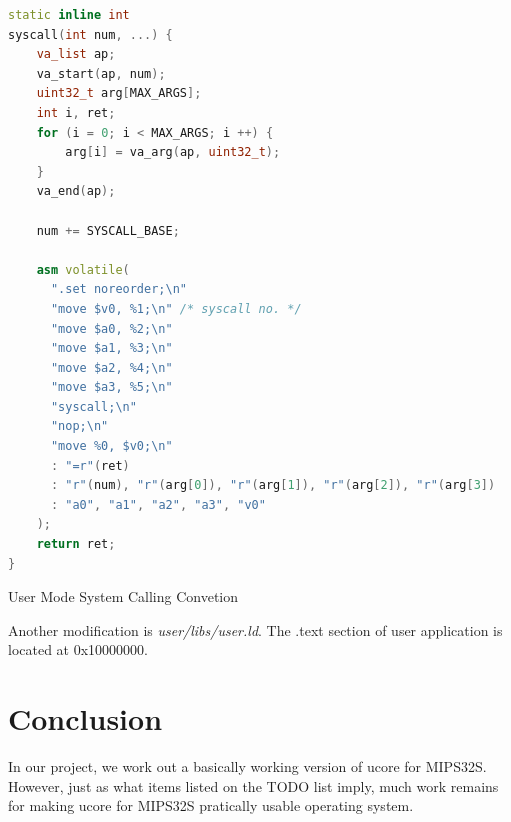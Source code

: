 \documentclass[a4paper]{article}
\begin{document}
\begin{algorithm}[h]
 \begin{lstlisting}[language={C++}]
static inline int
syscall(int num, ...) {
    va_list ap;
    va_start(ap, num);
    uint32_t arg[MAX_ARGS];
    int i, ret;
    for (i = 0; i < MAX_ARGS; i ++) {
        arg[i] = va_arg(ap, uint32_t);
    }
    va_end(ap);

    num += SYSCALL_BASE;

    asm volatile(
      ".set noreorder;\n"
      "move $v0, %1;\n" /* syscall no. */
      "move $a0, %2;\n"
      "move $a1, %3;\n"
      "move $a2, %4;\n"
      "move $a3, %5;\n"
      "syscall;\n"
      "nop;\n"
      "move %0, $v0;\n"
      : "=r"(ret)
      : "r"(num), "r"(arg[0]), "r"(arg[1]), "r"(arg[2]), "r"(arg[3]) 
      : "a0", "a1", "a2", "a3", "v0"
    );
    return ret;
}

\end{lstlisting}
\caption{User Mode System Calling Convetion}
\label{alg:syscall}
\end{algorithm}

Another modification is \emph{user/libs/user.ld}.
The .text section of user application is located at  0x10000000.


\section{Conclusion}
In our project, we work out a basically working version of ucore for MIPS32S.
However, just as what items listed on the TODO list imply,
much work remains for making ucore for MIPS32S pratically usable
operating system.





\end{document}
